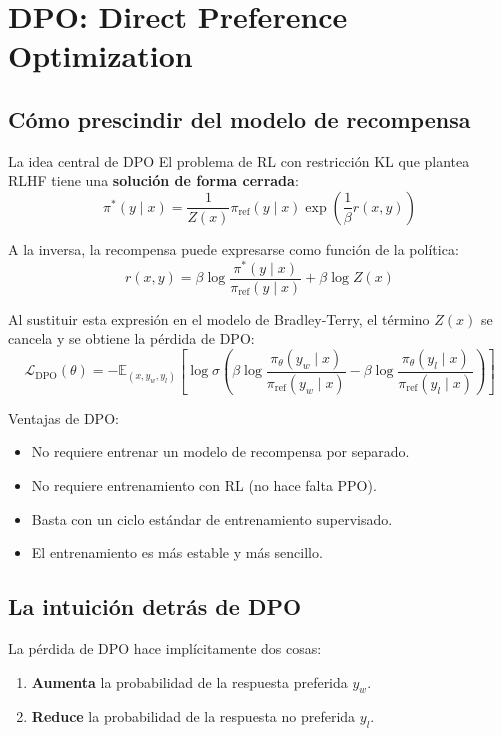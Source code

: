 \section{DPO: Direct Preference Optimization}

\subsection{Cómo prescindir del modelo de recompensa}

\begin{importantbox}{La idea central de DPO}
El problema de RL con restricción KL que plantea RLHF tiene una \textbf{solución de forma cerrada}:
$$\pi^*(y \mid x) = \frac{1}{Z(x)} \pi_{\mathrm{ref}}(y \mid x) \exp\left(\frac{1}{\beta} r(x, y)\right)$$

A la inversa, la recompensa puede expresarse como función de la política:
$$r(x, y) = \beta \log \frac{\pi^*(y \mid x)}{\pi_{\mathrm{ref}}(y \mid x)} + \beta \log Z(x)$$

Al sustituir esta expresión en el modelo de Bradley-Terry, el término $Z(x)$ se cancela y se obtiene la pérdida de DPO:
$$\mathcal{L}_{\mathrm{DPO}}(\theta) = -\mathbb{E}_{(x, y_w, y_l)}\left[\log \sigma\left(\beta \log \frac{\pi_\theta(y_w \mid x)}{\pi_{\mathrm{ref}}(y_w \mid x)} - \beta \log \frac{\pi_\theta(y_l \mid x)}{\pi_{\mathrm{ref}}(y_l \mid x)}\right)\right]$$
\end{importantbox}

Ventajas de DPO:
\begin{itemize}
    \item No requiere entrenar un modelo de recompensa por separado.
    \item No requiere entrenamiento con RL (no hace falta PPO).
    \item Basta con un ciclo estándar de entrenamiento supervisado.
    \item El entrenamiento es más estable y más sencillo.
\end{itemize}

\subsection{La intuición detrás de DPO}

La pérdida de DPO hace implícitamente dos cosas:
\begin{enumerate}
    \item \textbf{Aumenta} la probabilidad de la respuesta preferida $y_w$.
    \item \textbf{Reduce} la probabilidad de la respuesta no preferida $y_l$.
\end{enumerate}


